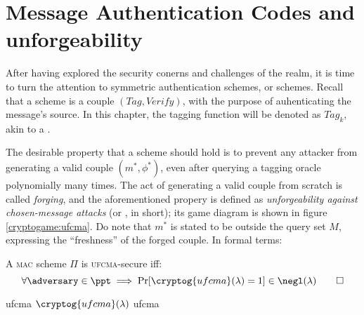 
\section{Message Authentication Codes and unforgeability}

After having explored the security conerns and challenges of the \ske{} realm, it is time to turn the attention to symmetric authentication schemes, or \mac{} schemes. Recall that a \mac{} scheme is a couple $(\textit{Tag}, \textit{Verify})$, with the purpose of auhenticating the message's source. In this chapter, the tagging function will be denoted as $\textit{Tag}_k$, akin to a \prf.

The desirable property that a \mac{} scheme should hold is to prevent any attacker from generating a valid couple $(m^*, \phi^*)$, even after querying a tagging oracle polynomially many times\footnotemark.
The act of generating a valid couple from scratch is called \emph{forging}, and the aforementioned propery is defined as \emph{unforgeability against chosen-message attacks} (or \ufcma, in short); its game diagram is shown in figure \ref{cryptogame:ufcma}. Do note that $m^*$ is stated to be outside the query set $M$, expressing the ``freshness'' of the forged couple\footnotemark. In formal terms:


\begin{definition}
    A \textsc{mac} scheme $\Pi$ is \textsc{ufcma}-secure iff:
    \[
        \forall \adversary \in \ppt \implies \Pr[\cryptog{ufcma}(\lambda) = 1] \in \negl(\lambda) \qedhere
    \]
\end{definition}

\begin{cryptogame}
    {ufcma}
    {$\cryptog{ufcma}(\lambda)$}
    {ufcma}


    \cseqbeginloop
    \cseqendloop
    
    \cseqdelay

    
\end{cryptogame}

